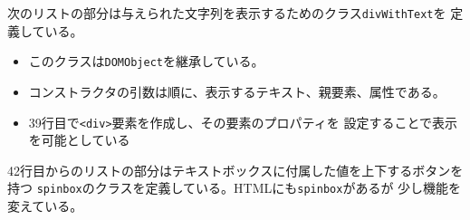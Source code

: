 次のリストの部分は与えられた文字列を表示するためのクラス\texttt{divWithText}を
定義している。
\begin{itemize}
 \item このクラスは\texttt{DOMObject}を継承している。
 \item コンストラクタの引数は順に、表示するテキスト、親要素、属性である。
 \item 39行目で\texttt{<div>}要素を作成し、その要素のプロパティを
       設定することで表示を可能としている
\end{itemize}

42行目からのリストの部分はテキストボックスに付属した値を上下するボタンを持つ
\texttt{spinbox}のクラスを定義している。HTMLにも\texttt{spinbox}があるが
少し機能を変えている。


